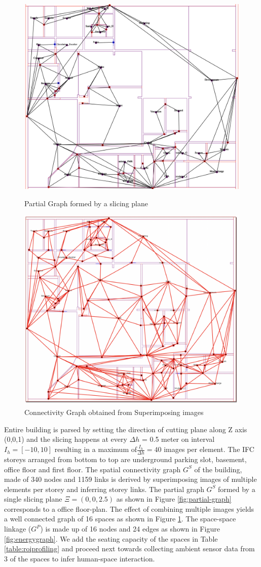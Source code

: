 \documentclass[conference]{IEEEtran}
\begin{document}
 \begin{figure}[h]
\centering
\includegraphics[width=.5\textwidth]{img/partial-graph.png}
\caption{Partial Graph formed by a slicing plane }
\label{fig:partial-graph}
\bigbreak
\includegraphics[width=.5\textwidth]{img/full-connectivity.png}
\caption{ Connectivity Graph obtained from Superimposing images}\label{fig:full-connectivity}
\end{figure}


Entire building is parsed by setting the direction of cutting plane along Z axis (0,0,1) and the slicing happens at every $\Delta h$ = 0.5 meter on interval $I_h = [-10, 10] $ resulting in a maximum of$\frac{I_h}{\Delta h} = 40 $ images per element.  The IFC storeys arranged from bottom to top are underground parking slot, basement, office floor and first floor. The spatial connectivity graph $G^S$ of the building, made of 340 nodes and 1159 links is derived by superimposing images of multiple elements per storey and inferring storey links. The partial graph $G^S$ formed by a single slicing plane $\Xi = (0,0,2.5)$ as shown in Figure \ref{fig:partial-graph} corresponds to a office floor-plan. The effect of combining multiple images yields a well connected graph of 16 spaces as shown in Figure \ref{fig:full-connectivity}. The space-space linkage ($G^P$) is made up of 16 nodes and 24 edges as shown in Figure \ref{fig:energygraph}. We add the seating capacity of the spaces in Table \ref{table:roiprofiling} and proceed next towards collecting ambient sensor data from 3 of the spaces to infer human-space interaction.
\end{document}
